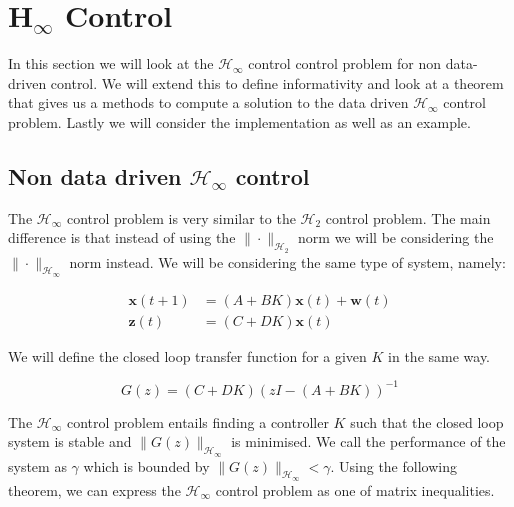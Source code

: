 \section{H$_\infty$ Control}
In this section we will look at the $\mathcal{H}_\infty$ control control problem for non data-driven control. We will extend this to define informativity and look at a theorem that gives us a methods to compute a solution to the data driven $\mathcal{H}_\infty$ control problem. Lastly we will consider the implementation as well as an example.

\subsection{Non data driven $\mathcal{H}_\infty$ control}
The $\mathcal{H}_\infty$ control problem is very similar to the $\mathcal{H}_2$ control problem. The main difference is that instead of using the $\| \cdot \|_{\mathcal{H}_2}$ norm we will be considering the $\| \cdot \|_{\mathcal{H}_\infty}$ norm instead. We will be considering the same type of system, namely:

\begin{align*}
	\mathbf{x}(t+1) &= (A + B K) \mathbf{x}(t) + \mathbf{w}(t) \\
	\mathbf{z}(t)   &= (C   + D   K) \mathbf{x}(t) 
\end{align*}

We will define the closed loop transfer function for a given $K$ in the same way.

\begin{equation*}
	G(z) = (C + DK)(z I - (A+BK))^{-1}
\end{equation*}

The $\mathcal{H}_\infty$ control problem entails finding a controller $K$ such that the closed loop system is stable and $\| G(z) \|_{\mathcal{H}_\infty}$ is minimised. We call the performance of the system as $\gamma$ which is bounded by $\| G(z) \|_{\mathcal{H}_\infty} < \gamma$. Using the following theorem, we can express the $\mathcal{H}_\infty$ control problem as one of matrix inequalities. 



